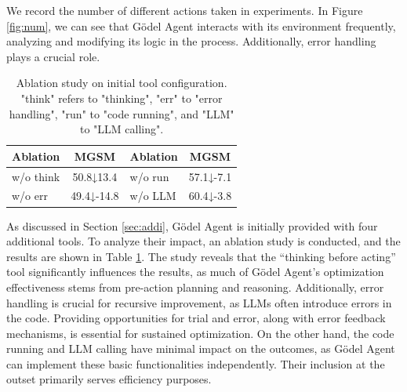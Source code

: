 \documentclass[11pt]{article}
\newcommand{\framework}{Gödel Agent\xspace}
\begin{document}
We record the number of different actions taken in experiments. In Figure \ref{fig:num}, we can see that \framework interacts with its environment frequently, analyzing and modifying its logic in the process. Additionally, error handling plays a crucial role.


\begin{table}[ht]
    \centering
    \small
    \begin{tabular}{lc|lc}
        \toprule
        Ablation & MGSM & Ablation & MGSM \\ 
        \midrule
        w/o think & 50.8\scriptsize{↓13.4} & w/o run & 57.1\scriptsize{↓-7.1} \\ 
        w/o err & 49.4\scriptsize{↓-14.8} & w/o LLM & 60.4\scriptsize{↓-3.8} \\ 
        \bottomrule
    \end{tabular}
    \caption{Ablation study on initial tool configuration. "think" refers to "thinking", "err" to "error handling", "run" to "code running", and "LLM" to "LLM calling".}
    \label{tab:ab_tool}
    \vspace{-0.2cm}
\end{table}

As discussed in Section \ref{sec:addi}, \framework is initially provided with four additional tools.
To analyze their impact, an ablation study is conducted, and the results are shown in Table \ref{tab:ab_tool}. The study reveals that the “thinking before acting” tool significantly influences the results, as much of \framework{}’s optimization effectiveness stems from pre-action planning and reasoning. Additionally, error handling is crucial for recursive improvement, as LLMs often introduce errors in the code. 
Providing opportunities for trial and error, along with error feedback mechanisms, is essential for sustained optimization.
On the other hand, the code running and LLM calling have minimal impact on the outcomes, as \framework can implement these basic functionalities independently. Their inclusion at the outset primarily serves efficiency purposes.
\end{document}
